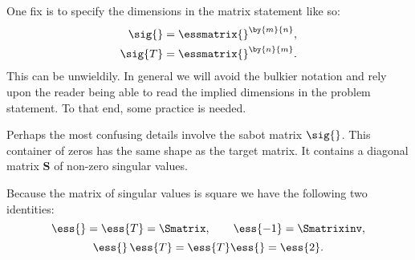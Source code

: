 One fix is to specify the dimensions in the matrix statement like so:
\begin{equation}
  \begin{split}
     \sig{} &= \essmatrix{}^{\by{m}{n}},\\
     \sig{T}&= \essmatrix{}^{\by{n}{m}}.
  \end{split}
\end{equation}
This can be unwieldily. In general we will avoid the bulkier notation and rely upon the reader being able to read the implied dimensions in the problem statement. To that end, some practice is needed.

Perhaps the most confusing details involve the sabot matrix $\sig{}$. This container of zeros has the same shape as the target matrix. It contains a diagonal matrix $\textbf{S}$ of non-zero singular values.

Because the matrix of singular values is square we have the following two identities:
\begin{equation*}
  \ess{} = \ess{T} = \Smatrix, \qquad \ess{-1} = \Smatrixinv,
\end{equation*}
\begin{equation*}
  \ess{}\,\ess{T} = \ess{T}\ess{} = \ess{2}.
\end{equation*}

